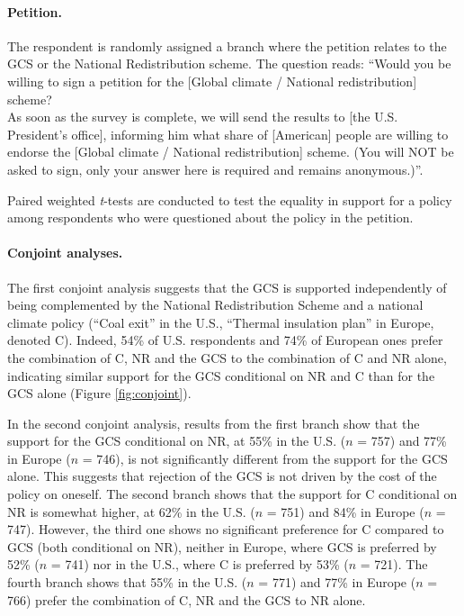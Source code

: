 \begin{bibunit}
\begin{small}
\paragraph{\small Petition.}
The respondent is randomly assigned a branch where the petition relates to the GCS or the National Redistribution scheme. The question reads: ``Would you be willing to sign a petition for the [Global climate / National redistribution] scheme? \\ As soon as the survey is complete, we will send the results to [the U.S. President's office], informing him what share of [American] people are willing to endorse the [Global climate / National redistribution] scheme. (You will NOT be asked to sign, only your answer here is required and remains anonymous.)''. 

Paired weighted \textit{t}-tests are conducted to test the equality in support for a policy among respondents who were questioned about the policy in the petition. 

\paragraph{\small Conjoint analyses.}
The first conjoint analysis suggests that the GCS is supported independently of being complemented by the National Redistribution Scheme and a national climate policy (``Coal exit'' in the U.S., ``Thermal insulation plan'' in Europe, denoted C). Indeed, 54\% of %
U.S. respondents and 74\% of %
European ones prefer the combination of C, NR and the GCS to the combination of C and NR alone, indicating similar support for the GCS conditional on NR and C than for the GCS alone (Figure \ref{fig:conjoint}). 

In the second conjoint analysis, results from the first branch show that the support for the GCS conditional on NR, at 55\% in the U.S. ($n$ = 757) and 77\% in Europe ($n$ = 746), is not significantly different from the support for the GCS alone. This suggests that rejection of the GCS is not driven by the cost of the policy on oneself. The second branch shows that the support for C conditional on NR is somewhat higher, at 62\% in the U.S. ($n$ = 751) and 84\% in Europe ($n$ = 747). However, the third one shows no significant preference for C compared to GCS (both conditional on NR), neither in Europe, where GCS is preferred by 52\% ($n$ = 741) nor in the U.S., where C is preferred by 53\% ($n$ = 721). The fourth branch shows that 55\% in the U.S. ($n$ = 771) and 77\% in Europe ($n$ = 766) prefer the combination of C, NR and the GCS to NR alone.


\end{small}
\end{bibunit}

